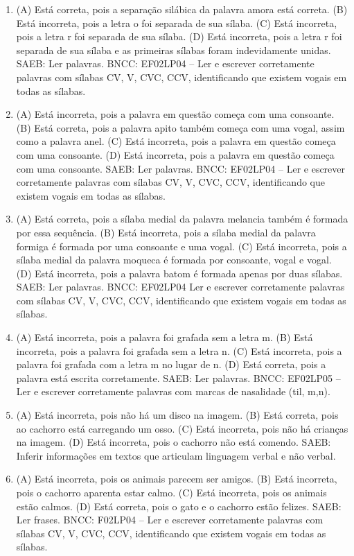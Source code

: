 \begin{enumerate}
\item
(A) Está correta, pois a separação silábica da palavra amora está correta.
(B) Está incorreta, pois a letra o foi separada de sua sílaba.
(C) Está incorreta, pois a letra r foi separada de sua sílaba.
(D) Está incorreta, pois a letra r foi separada de sua sílaba e as primeiras sílabas foram indevidamente unidas.
SAEB: Ler palavras.
BNCC: EF02LP04 -- Ler e escrever corretamente palavras com
sílabas CV, V, CVC, CCV, identificando que existem vogais em todas as
sílabas.

\item
(A) Está incorreta, pois a palavra em questão começa com uma consoante.
(B) Está correta, pois a palavra apito também começa com uma vogal, assim como a palavra anel.
(C) Está incorreta, pois a palavra em questão começa com uma consoante.
(D) Está incorreta, pois a palavra em questão começa com uma consoante.
SAEB: Ler palavras.
BNCC: EF02LP04 -- Ler e escrever corretamente palavras com
sílabas CV, V, CVC, CCV, identificando que existem vogais em todas as
sílabas.

\item
(A) Está correta, pois a sílaba medial da palavra melancia também é formada por essa sequência.
(B) Está incorreta, pois a sílaba medial da palavra formiga é formada por uma consoante e uma vogal.
(C) Está incorreta, pois a sílaba medial da palavra moqueca é formada por consoante, vogal e vogal.
(D) Está incorreta, pois a palavra batom é formada apenas por duas sílabas.
SAEB: Ler palavras.
BNCC: EF02LP04 Ler e escrever corretamente palavras com
sílabas CV, V, CVC, CCV, identificando que existem vogais em todas as
sílabas.

\item
(A) Está incorreta, pois a palavra foi grafada sem a letra m.
(B) Está incorreta, pois a palavra foi grafada sem a letra n.
(C) Está incorreta, pois a palavra foi grafada com a letra m no lugar de n.
(D) Está correta, pois a palavra está escrita corretamente.
SAEB: Ler palavras.
BNCC: EF02LP05 -- Ler e escrever corretamente palavras com marcas
de nasalidade (til, m,n).

\item
(A) Está incorreta, pois não há um disco na imagem.
(B) Está correta, pois ao cachorro está carregando um osso.
(C) Está incorreta, pois não há crianças na imagem.
(D) Está incorreta, pois o cachorro não está comendo.
SAEB: Inferir informações em textos que articulam linguagem verbal e não verbal.

\item
(A) Está incorreta, pois os animais parecem ser amigos.
(B) Está incorreta, pois o cachorro aparenta estar calmo.
(C) Está incorreta, pois os animais estão calmos.
(D) Está correta, pois o gato e o cachorro estão felizes.
SAEB: Ler frases.
BNCC: F02LP04 -- Ler e escrever corretamente palavras com sílabas
CV, V, CVC, CCV, identificando que existem vogais em todas as sílabas.


\end{enumerate}
